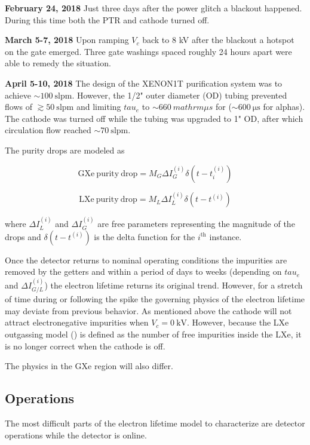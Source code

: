\textbf{February 24, 2018}  Just three days after the power glitch a blackout happened.  During this time both the PTR and cathode turned
off.

\textbf{March 5-7, 2018}  Upon ramping $V_c$ back to 8 kV after the blackout a hotspot on the gate emerged.  Three gate washings spaced
roughly 24 hours apart were able to remedy the situation.

\textbf{April 5-10, 2018}  The design of the XENON1T purification system was to achieve ${\sim} 100\ \mathrm{slpm}$.  However, the
1/2" outer diameter (OD) tubing prevented flows of $\gtrsim 50\ \mathrm{slpm}$ and limiting $tau_e$ to ${\sim} 660\ mathrm{\mu s}$ for
\metakr (${\sim} 600\ \mathrm{\mu s}$ for alphas).  The cathode was turned off while the tubing was upgraded to 1" OD, after which
circulation flow reached ${\sim} 70\ \mathrm{slpm}$.

The purity drops are modeled as

\begin{equation}
\mathrm{GXe\ purity\ drop} = M_G \Delta I_G^{(i)} \delta (t - t_i^{(i)})
\end{equation}

\begin{equation}
\mathrm{LXe\ purity\ drop} = M_L \Delta I_L^{(i)} \delta (t - t^{(i)})
\end{equation}

\noindent where $\Delta I_L^{(i)}$ and $\Delta I_G^{(i)}$ are free parameters representing the magnitude of the drops and
$\delta (t - t^{(i)})$ is the delta function for the $i^{\mathrm{th}}$ instance.

Once the detector returns to nominal operating conditions the impurities are removed by the getters and within a period of days to weeks
(depending on $tau_e$ and $\Delta I_{G/L}^{(i)}$) the electron lifetime returns its original trend.  However, for a stretch of time during
or following the spike the governing physics of the electron lifetime may deviate from previous behavior.  As mentioned above the
cathode will not attract electronegative impurities when $V_c = 0\ \mathrm{kV}$.  However, because the LXe outgassing model
() is defined as the number of free impurities
inside the LXe, it is no longer correct when the cathode is off.

The physics in the GXe region will also differ.



\subsection{Operations}
\label{subsec:electron_lifetime_model_ops}
The most difficult parts of the electron lifetime model to characterize are detector operations while the detector is online.




